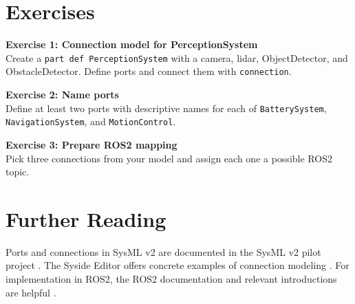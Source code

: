 \section{Exercises}
\begin{uebungbox}
\textbf{Exercise 1: Connection model for PerceptionSystem}\\
Create a \texttt{part def PerceptionSystem} with a camera, lidar, ObjectDetector, and ObstacleDetector. Define ports and connect them with \texttt{connection}.
\end{uebungbox}

\begin{uebungbox}
\textbf{Exercise 2: Name ports}\\
Define at least two ports with descriptive names for each of \texttt{BatterySystem}, \texttt{NavigationSystem}, and \texttt{MotionControl}.
\end{uebungbox}

\begin{uebungbox}
\textbf{Exercise 3: Prepare ROS2 mapping}\\
Pick three connections from your model and assign each one a possible ROS2 topic.
\end{uebungbox}

\section{Further Reading}
Ports and connections in SysML v2 are documented in the SysML v2 pilot project \cite{sysmlv2pilot}. The Syside Editor offers concrete examples of connection modeling \cite{syside}. For implementation in ROS2, the ROS2 documentation and relevant introductions are helpful \cite{ros2docs}.
